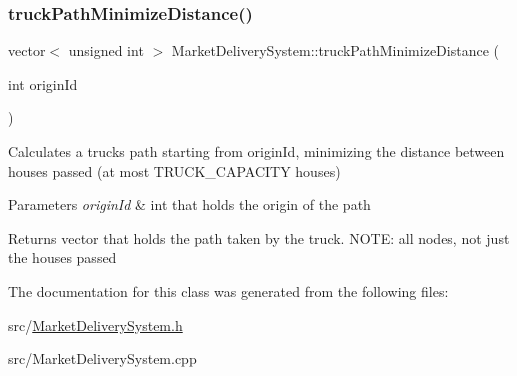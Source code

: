 \subsubsection{\texorpdfstring{truck\+Path\+Minimize\+Distance()}{truckPathMinimizeDistance()}}
{\footnotesize\ttfamily vector$<$ unsigned int $>$ Market\+Delivery\+System\+::truck\+Path\+Minimize\+Distance (\begin{DoxyParamCaption}\item[{int}]{origin\+Id }\end{DoxyParamCaption})}



Calculates a truck\textquotesingle{}s path starting from origin\+Id, minimizing the distance between houses passed (at most T\+R\+U\+C\+K\+\_\+\+C\+A\+P\+A\+C\+I\+TY houses) 


\begin{DoxyParams}{Parameters}
{\em origin\+Id} & int that holds the origin of the path \\
\hline
\end{DoxyParams}
\begin{DoxyReturn}{Returns}
vector that holds the path taken by the truck. N\+O\+TE\+: all nodes, not just the houses passed 
\end{DoxyReturn}


The documentation for this class was generated from the following files\+:\begin{DoxyCompactItemize}
\item 
src/\hyperlink{_market_delivery_system_8h}{Market\+Delivery\+System.\+h}\item 
src/Market\+Delivery\+System.\+cpp\end{DoxyCompactItemize}
